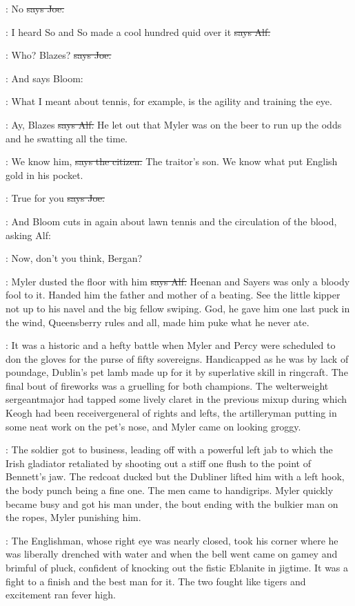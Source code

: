 \joe:
No
\sout{says Joe.}

\bergan:
I heard So and So made a cool hundred quid
over it
\sout{says Alf.}

\joe:
Who?
Blazes?
\sout{says Joe.}

\Nq:
And says Bloom:

\Bloom:
What I meant about tennis,
for example,
is the agility and training the eye.

\bergan:
Ay,
Blazes
\sout{says Alf.}
He let out that Myler was on the beer to run up
the odds and he swatting all the time.

\citizen:
We know him,
\sout{says the citizen.}
The traitor's son.
We know what put
English gold in his pocket.

\joe:
True for you
\sout{says Joe.}

\Nq:
And Bloom cuts in again about lawn tennis and the circulation of the
blood,
asking Alf:

\Bloom:
Now,
don't you think,
Bergan?

\bergan:
Myler dusted the floor with him
\sout{says Alf.}
Heenan and Sayers was only a
bloody fool to it.
Handed him the father and mother of a beating.
See the
little kipper not up to his navel and the big fellow swiping.
God,
he gave
him one last puck in the wind,
Queensberry rules and all,
made him puke
what he never ate.

:
It was a historic and a hefty battle
when Myler and Percy were
scheduled to don the gloves for the purse of fifty sovereigns.
Handicapped
as he was by lack of poundage,
Dublin's pet lamb made up for it by
superlative skill in ringcraft.
The final bout of fireworks was a
gruelling for both champions.
The welterweight sergeantmajor had
tapped some lively claret in the previous mixup during which Keogh
had been receivergeneral of rights and lefts,
the artilleryman
putting in some neat work on the pet's nose,
and Myler came on
looking groggy.

:
The soldier got to business,
leading off with a
powerful left jab to which the Irish gladiator retaliated by shooting
out a stiff one flush to the point of Bennett's jaw.
The redcoat
ducked but the Dubliner lifted him with a left hook,
the body punch being
a fine one.
The men came to handigrips.
Myler quickly became busy and got
his man under,
the bout ending with the bulkier man on the ropes,
Myler
punishing him.

:
The Englishman,
whose right eye was nearly closed,
took
his corner where he was liberally drenched with water and when the bell
went came on gamey and brimful of pluck,
confident of knocking out the
fistic Eblanite in jigtime.
It was a fight to a finish and the best man
for it.
The two fought like tigers and excitement ran fever high.

